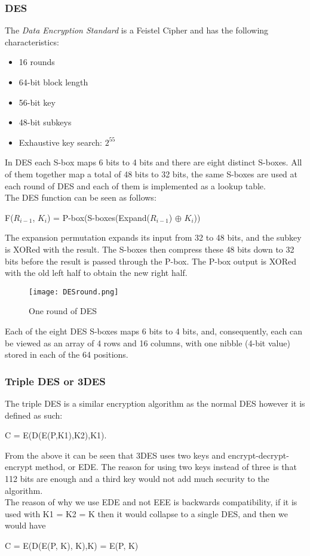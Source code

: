 \documentclass{article}
\begin{document}
\subsubsection{DES}
The \textit{Data Encryption Standard} is a Feistel Cipher and has the following characteristics:
\begin{itemize}
    \item 16 rounds
    \item 64-bit block length
    \item 56-bit key
    \item 48-bit subkeys
    \item Exhaustive key search: $2^{55}$
\end{itemize}
In DES each S-box maps 6 bits to 4 bits and there are eight distinct S-boxes. All of them together map a total of 48 bits to 32 bits, the same S-boxes are used at each round of DES and each of them is implemented as a lookup table.\\
The DES function can be seen as follows:
\begin{center}
    F($R_{i-1}$, $K_i$) = P-box(S-boxes(Expand($R_{i-1}$) $\oplus$ $K_{i}$))
\end{center}
The expansion permutation expands its input from 32 to 48 bits, and the subkey is XORed with the result. The S-boxes then compress these 48 bits down to 32 bits before the result is passed through the P-box. The P-box output is XORed with the old left half to obtain the new right half.

\begin{figure}[H]
    \centering
    \caption{One round of DES}
    \texttt{[image: DESround.png]}
\end{figure}
Each of the eight DES S-boxes maps 6 bits to 4 bits, and, consequently, each can be viewed as an array of 4 rows and 16 columns, with one nibble (4-bit value) stored in each of the 64 positions.

\subsubsection{Triple DES or 3DES}
The triple DES is a similar encryption algorithm as the normal DES however it is defined as such:
\begin{center}
    C = E(D(E(P,K1),K2),K1).
\end{center}{}
From the above it can be seen that 3DES uses two keys and encrypt-decrypt-encrypt method, or EDE. The reason for using two keys instead of three is that 112 bits are enough and a third key would not add much security to the algorithm.\\
The reason of why we use EDE and not EEE is backwards compatibility, if it is used with K1 = K2 = K then it would collapse to a single DES, and then we would have
\begin{center}
    C = E(D(E(P, K), K),K) = E(P, K)
\end{center}{}
\end{document}
